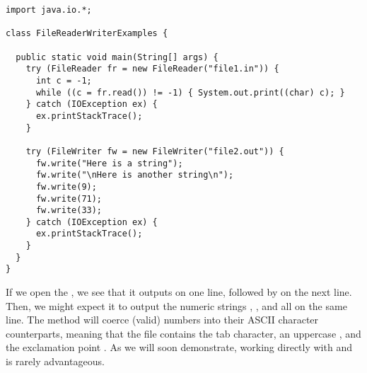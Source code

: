 

\begin{lstlisting}[language=MyJava]
import java.io.*;

class FileReaderWriterExamples {

  public static void main(String[] args) {
    try (FileReader fr = new FileReader("file1.in")) {
      int c = -1; 
      while ((c = fr.read()) != -1) { System.out.print((char) c); }
    } catch (IOException ex) {
      ex.printStackTrace();
    }

    try (FileWriter fw = new FileWriter("file2.out")) {
      fw.write("Here is a string");
      fw.write("\nHere is another string\n"); 
      fw.write(9);
      fw.write(71);
      fw.write(33);
    } catch (IOException ex) {
      ex.printStackTrace();
    }
  }
}

\end{lstlisting}

If we open the , we see that it outputs  on one line, followed by  on the next line. Then, we might expect it to output the numeric strings , , and  all on the same line. The  method will coerce (valid) numbers into their ASCII character counterparts, meaning that the file contains the tab character, an uppercase , and the exclamation point . As we will soon demonstrate, working directly with  and  is rarely advantageous. 

